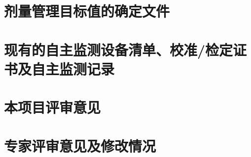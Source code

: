 \section{剂量管理目标值的确定文件}

\section{现有的自主监测设备清单、校准/检定证书及自主监测记录}

\section{本项目评审意见}

\section{专家评审意见及修改情况}
